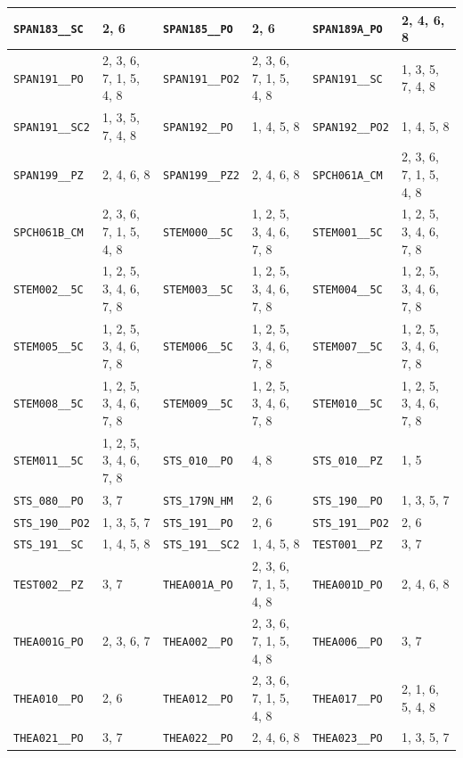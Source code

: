 \begin{longtable}{|l|l||l|l||l|l|}
    \verb|SPAN183__SC| & 2, 6 & \verb|SPAN185__PO| & 2, 6 & \verb|SPAN189A_PO| & 2, 4, 6, 8\\\hline
    \verb|SPAN191__PO| & 2, 3, 6, 7, 1, 5, 4, 8 & \verb|SPAN191__PO2| & 2, 3, 6, 7, 1, 5, 4, 8 & \verb|SPAN191__SC| & 1, 3, 5, 7, 4, 8\\\hline
    \verb|SPAN191__SC2| & 1, 3, 5, 7, 4, 8 & \verb|SPAN192__PO| & 1, 4, 5, 8 & \verb|SPAN192__PO2| & 1, 4, 5, 8\\\hline
    \verb|SPAN199__PZ| & 2, 4, 6, 8 & \verb|SPAN199__PZ2| & 2, 4, 6, 8 & \verb|SPCH061A_CM| & 2, 3, 6, 7, 1, 5, 4, 8\\\hline
    \verb|SPCH061B_CM| & 2, 3, 6, 7, 1, 5, 4, 8 & \verb|STEM000__5C| & 1, 2, 5, 3, 4, 6, 7, 8 & \verb|STEM001__5C| & 1, 2, 5, 3, 4, 6, 7, 8\\\hline
    \verb|STEM002__5C| & 1, 2, 5, 3, 4, 6, 7, 8 & \verb|STEM003__5C| & 1, 2, 5, 3, 4, 6, 7, 8 & \verb|STEM004__5C| & 1, 2, 5, 3, 4, 6, 7, 8\\\hline
    \verb|STEM005__5C| & 1, 2, 5, 3, 4, 6, 7, 8 & \verb|STEM006__5C| & 1, 2, 5, 3, 4, 6, 7, 8 & \verb|STEM007__5C| & 1, 2, 5, 3, 4, 6, 7, 8\\\hline
    \verb|STEM008__5C| & 1, 2, 5, 3, 4, 6, 7, 8 & \verb|STEM009__5C| & 1, 2, 5, 3, 4, 6, 7, 8 & \verb|STEM010__5C| & 1, 2, 5, 3, 4, 6, 7, 8\\\hline
    \verb|STEM011__5C| & 1, 2, 5, 3, 4, 6, 7, 8 & \verb|STS_010__PO| & 4, 8 & \verb|STS_010__PZ| & 1, 5\\\hline
    \verb|STS_080__PO| & 3, 7 & \verb|STS_179N_HM| & 2, 6 & \verb|STS_190__PO| & 1, 3, 5, 7\\\hline
    \verb|STS_190__PO2| & 1, 3, 5, 7 & \verb|STS_191__PO| & 2, 6 & \verb|STS_191__PO2| & 2, 6\\\hline
    \verb|STS_191__SC| & 1, 4, 5, 8 & \verb|STS_191__SC2| & 1, 4, 5, 8 & \verb|TEST001__PZ| & 3, 7\\\hline
    \verb|TEST002__PZ| & 3, 7 & \verb|THEA001A_PO| & 2, 3, 6, 7, 1, 5, 4, 8 & \verb|THEA001D_PO| & 2, 4, 6, 8\\\hline
    \verb|THEA001G_PO| & 2, 3, 6, 7 & \verb|THEA002__PO| & 2, 3, 6, 7, 1, 5, 4, 8 & \verb|THEA006__PO| & 3, 7\\\hline
    \verb|THEA010__PO| & 2, 6 & \verb|THEA012__PO| & 2, 3, 6, 7, 1, 5, 4, 8 & \verb|THEA017__PO| & 2, 1, 6, 5, 4, 8\\\hline
    \verb|THEA021__PO| & 3, 7 & \verb|THEA022__PO| & 2, 4, 6, 8 & \verb|THEA023__PO| & 1, 3, 5, 7\\\hline

\end{longtable}
